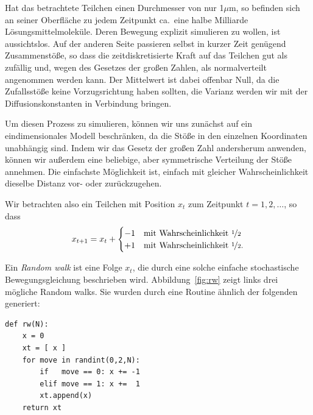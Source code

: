 Hat das betrachtete Teilchen einen Durchmesser von nur 1$\mu$m, so
befinden sich an seiner Oberfläche zu jedem Zeitpunkt ca.\ eine halbe
Milliarde Lösungsmittelmoleküle. Deren Bewegung explizit simulieren zu
wollen, ist aussichtslos. Auf der anderen Seite passieren selbst in
kurzer Zeit genügend Zusammenstöße, so dass die zeitdiskretisierte
Kraft auf das Teilchen gut als zufällig und, wegen des Gesetzes der
großen Zahlen, als normalverteilt angenommen werden kann. Der Mittelwert
ist dabei offenbar Null, da die Zufallsstöße keine Vorzugsrichtung
haben sollten, die Varianz werden wir mit der Diffusionskonstanten in
Verbindung bringen.

Um diesen Prozess zu simulieren, können wir uns zunächst auf ein
eindimensionales Modell beschränken, da die Stöße in den
einzelnen Koordinaten unabhängig sind. Indem wir das Gesetz der großen Zahl
andersherum anwenden, können wir außerdem eine beliebige, aber
symmetrische Verteilung der Stöße annehmen. Die einfachste Möglichkeit
ist, einfach mit gleicher Wahrscheinlichkeit dieselbe Distanz vor-
oder zurückzugehen.

Wir betrachten also ein Teilchen mit Position $x_t$ zum Zeitpunkt
$t=1, 2,\ldots$, so dass
\begin{equation}
  \label{eq:rw}
  x_{t+1} = x_t +
  \begin{cases}
    -1 & \text{mit Wahrscheinlichkeit \nicefrac{1}{2}}\\
    +1 & \text{mit Wahrscheinlichkeit \nicefrac{1}{2}}.
  \end{cases}
\end{equation}

Ein \emph{Random walk} ist eine Folge $x_t$, die durch eine solche
einfache stochastische Bewegungsgleichung beschrieben wird.
Abbildung~\ref{fig:rw} zeigt links drei mögliche Random
walks. Sie wurden durch eine Routine ähnlich der folgenden generiert: 
\begin{lstlisting}
def rw(N):
    x = 0
    xt = [ x ] 
    for move in randint(0,2,N):
        if   move == 0: x += -1
        elif move == 1: x +=  1
        xt.append(x)
    return xt
\end{lstlisting}

